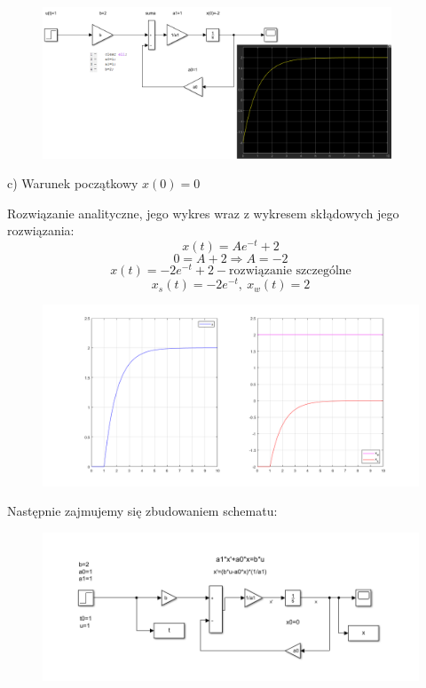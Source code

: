 \documentclass{article}
\begin{document}
\begin{figure}[h!]
    \centering
    \includegraphics[width=0.928\textwidth]{symulacja3B.png}
    \label{fig:my_label}
\end{figure}

\newpage



\begin{flushleft}
c) Warunek początkowy $x(0)=0$\\

\end{flushleft}
Rozwiązanie analityczne, jego wykres wraz z wykresem skłądowych jego rozwiązania:\\
$$
x(t)=Ae^{-t}+2
$$
$$
0=A+2 \Rightarrow A=-2
$$
$$
x(t)=-2e^{-t}+2-\text{rozwiązanie szczególne}
$$
$$
x_s(t)=-2e^{-t}, \  x_w(t)=2
$$

\begin{figure}[h!]
    \centering
    \includegraphics[width=\textwidth]{x_0.png}
    \label{fig:my_label}
\end{figure}
Następnie zajmujemy się zbudowaniem schematu:\\
\begin{figure}[h!]
    \centering
    \includegraphics[width=\textwidth]{schemat_0w.png}
    \label{fig:my_label}
\end{figure}
\end{document}
